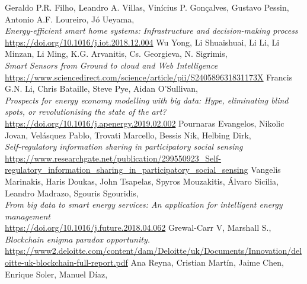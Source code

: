 \documentclass[11pt]{article}
\begin{document}
\begin{thebibliography}{22}
	Geraldo P.R. Filho, Leandro A. Villas, Vinícius P. Gonçalves, Gustavo Pessin, Antonio A.F. Loureiro, Jó Ueyama, \\
	\textit{Energy-efficient smart home systems: Infrastructure
		and decision-making process}\\
	\hyperref[https://doi.org/10.1016/j.iot.2018.12.004]{https://doi.org/10.1016/j.iot.2018.12.004}
	Wu Yong, Li Shuaishuai, Li Li, Li Minzan, Li Ming, K.G. Arvanitis, Cs. Georgieva, N. Sigrimis, \\
	\textit{Smart Sensors from Ground to cloud and Web Intelligence}\\
	\hyperref[https://www.sciencedirect.com/science/article/pii/S240589631831173X]{https://www.sciencedirect.com/science/article/pii/S240589631831173X}
	Francis G.N. Li, Chris Bataille, Steve Pye, Aidan O'Sullivan, \\
	\textit{Prospects for energy economy modelling with big data: Hype, eliminating blind spots, or revolutionising the state of the art?}\\
	\hyperref[https://doi.org/10.1016/j.apenergy.2019.02.002]{https://doi.org/10.1016/j.apenergy.2019.02.002}
	Pournaras Evangelos, Nikolic Jovan, Velásquez Pablo, Trovati Marcello, Bessis Nik, Helbing Dirk, \\
	\textit{Self-regulatory information sharing in participatory social sensing}\\
	\hyperref[https://www.researchgate.net/publication/299550923_Self-regulatory_information_sharing_in_participatory_social_sensing]{https://www.researchgate.net/publication/299550923\_Self-regulatory\_information\_sharing\_in\_participatory\_social\_sensing}
	Vangelis Marinakis, Haris Doukas, John Tsapelas, Spyros Mouzakitis, Álvaro Sicilia, Leandro Madrazo, Sgouris Sgouridis, \\
	\textit{From big data to smart energy services: An application for intelligent energy management}\\
	\hyperref[https://doi.org/10.1016/j.future.2018.04.062]{https://doi.org/10.1016/j.future.2018.04.062}
	Grewal-Carr V, Marshall S., \\
	\textit{Blockchain enigma paradox opportunity.}\\
	\hyperref[https://www2.deloitte.com/content/dam/Deloitte/uk/Documents/Innovation/deloitte-uk-blockchain-full-report.pdf]{https://www2.deloitte.com/content/dam/Deloitte/uk/Documents/Innovation/deloitte-uk-blockchain-full-report.pdf}
	Ana Reyna, Cristian Martín, Jaime Chen, Enrique Soler, Manuel Díaz, \\

\end{thebibliography}
\end{document}
